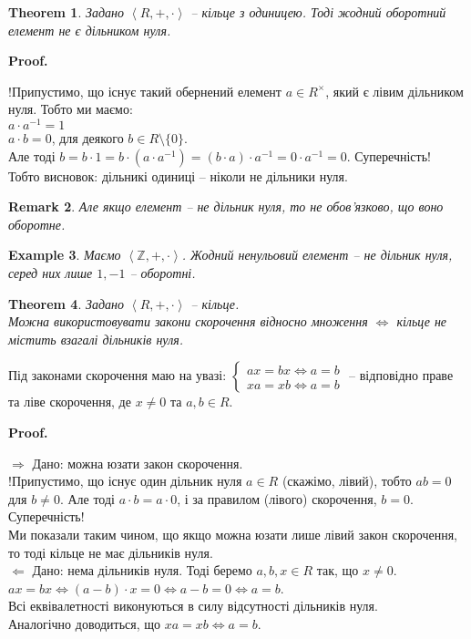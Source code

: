 \documentclass[a4paper, 10pt]{article}
\makeatletter
\def\rightproof{$\boxed{\Rightarrow}$ }
\def\leftproof{$\boxed{\Leftarrow}$ }
\theoremstyle{theoremdd}
\newtheorem{theorem}{Theorem}[subsection]
\theoremstyle{theoremdd}
\theoremstyle{theoremdd}
\theoremstyle{theoremdd}
\theoremstyle{theoremdd}
\newtheorem{example}[theorem]{Example}
\theoremstyle{theoremdd}
\theoremstyle{theoremdd}
\theoremstyle{theoremdd}
\theoremstyle{theoremdd}
\theoremstyle{theoremdd}
\theoremstyle{theoremdd}
\newtheorem{remark}[theorem]{Remark}
\theoremstyle{theoremdd}
\theoremstyle{theoremdd}
\theoremstyle{theoremdd}
\theoremstyle{theoremdd}
\renewenvironment{proof}[1][Proof.\\]{\par
\pushQED{\hfill \qed}%
\normalfont \topsep6\p@\@plus6\p@\relax
\trivlist
\item\relax
{\bfseries
#1\@addpunct{.}}\hspace\labelsep\ignorespaces
}{%
\popQED\endtrivlist\@endpefalse
}
\makeatother
\begin{document}
\begin{theorem}
\label{inverses_are_not_zero_divisors}
Задано $\left<R,+,\cdot \right>$ -- кільце з одиницею. Тоді жодний оборотний елемент не є дільником нуля.
\end{theorem}

\begin{proof}
!Припустимо, що існує такий обернений елемент $a \in R^\times$, який є лівим дільником нуля. Тобто ми маємо:\\
$a \cdot a^{-1} = 1$\\
$a \cdot b = 0$, для деякого $b \in R \setminus \{0\}$.\\
Але тоді $b = b \cdot 1 = b \cdot (a \cdot a^{-1}) = (b \cdot a) \cdot a^{-1} = 0 \cdot a^{-1} = 0$. Суперечність!\\
Тобто висновок: дільникі одиниці -- ніколи не дільники нуля.
\end{proof}

\begin{remark}
Але якщо елемент -- не дільник нуля, то не обов'язково, що воно оборотне.
\end{remark}

\begin{example}
Маємо $\left< \mathbb{Z},+,\cdot \right>$. Жодний ненульовий елемент -- не дільник нуля, серед них лише $1,-1$ -- оборотні.
\end{example}

\begin{theorem}
Задано $\left<R,+,\cdot \right>$ -- кільце.\\
Можна використовувати закони скорочення відносно множення $\iff$ кільце не містить взагалі дільників нуля.
\end{theorem}
Під законами скорочення маю на увазі:
$\begin{cases}
ax = bx \iff a = b \\
xa = xb \iff a = b
\end{cases}$ -- відповідно праве та ліве скорочення, де $x \neq 0$ та $a,b \in R$.

\begin{proof}
\rightproof Дано: можна юзати закон скорочення.\\
!Припустимо, що існує один дільник нуля $a \in R$ (скажімо, лівий), тобто $ab = 0$ для $b \neq 0$. Але тоді $a \cdot b = a \cdot 0$, і за правилом (лівого) скорочення, $b = 0$. Суперечність!\\
Ми показали таким чином, що якщо можна юзати лише лівий закон скорочення, то тоді кільце не має дільників нуля.
\bigskip \\
\leftproof Дано: нема дільників нуля. Тоді беремо $a,b,x \in R$ так, що $x \neq 0$.\\
$ax = bx \iff (a-b) \cdot x = 0 \iff a-b = 0 \iff a = b$.\\
Всі еквівалетності виконуються в силу відсутності дільників нуля. \\
Аналогічно доводиться, що $xa = xb \iff a = b$.
\end{proof}
\end{document}
